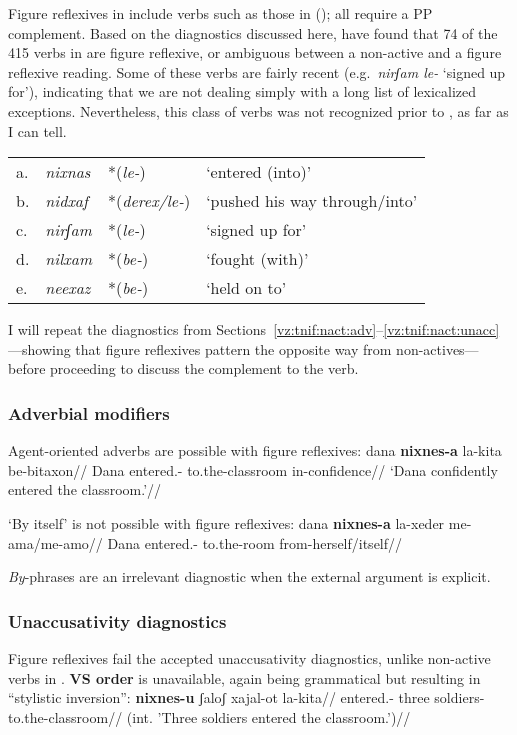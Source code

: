 Figure reflexives in {\tnif} include verbs such as those in (\nextx); all require a PP complement. Based on the diagnostics discussed here, \cite{ahdoutkastner19nels} have found that 74 of the 415 verbs in {\tnif} are figure reflexive, or ambiguous between a non-active and a figure reflexive reading. Some of these verbs are fairly recent (e.g.~\emph{nirʃam le-} `signed up for'), indicating that we are not dealing simply with a long list of lexicalized exceptions. Nevertheless, this class of verbs was not recognized prior to \cite{kastner16phd}, as far as I can tell.
\ex\label{ex:vz:figrefl} \begin{tabular}{l>{\em}lll}
	a.& nixnas &  *(\emph{le-}) & `entered (into)'\\
	b.& nidxaf & *(\emph{derex/le-})  & `pushed his way through/into' \\
	c.& nirʃam & *(\emph{le-})  & `signed up for' \\
	d.& nilxam & *(\emph{be-}) & `fought (with)' \\
	e.& neexaz & *(\emph{be-}) & `held on to' \\
    \end{tabular}
\xe

I will repeat the diagnostics from Sections~\ref{vz:tnif:nact:adv}--\ref{vz:tnif:nact:unacc}---showing that figure reflexives pattern the opposite way from non-actives---before proceeding to discuss the complement to the verb.

		\subsubsection{Adverbial modifiers} \label{vz:tnif:figrefl:adv}
Agent-oriented adverbs are possible with figure reflexives:
\ex\label{ex:vz:nixnesa}\begingl
	\gla dana \textbf{nixnes-a} la-kita be-bitaxon//
	\glb Dana entered.- to.the-classroom in-confidence//
	\glft `Dana confidently entered the classroom.'//
	\endgl
\xe

`By itself' is not possible with figure reflexives:
\ex \begingl
	\gla\ljudge{*}dana \textbf{nixnes-a} la-xeder me-a{\ts}ma/me-a{\ts}mo//
	\glb Dana entered.- to.the-room from-herself/itself//
	\endgl
\xe

\emph{By}-phrases are an irrelevant diagnostic when the external argument is explicit.

		\subsubsection{Unaccusativity diagnostics} \label{vz:tnif:figrefl:unacc}
Figure reflexives fail the accepted unaccusativity diagnostics, unlike non-active verbs in {\tnif}. \textbf{VS order} is unavailable, again being grammatical but resulting in ``stylistic inversion'':
\ex \begingl
	\gla\ljudge{\#}\textbf{nixnes-u} ʃaloʃ xajal-ot la-kita//
	\glb entered.- three soldiers- to.the-classroom//
	\glft (int. 'Three soldiers entered the classroom.')//
	\endgl
\xe

